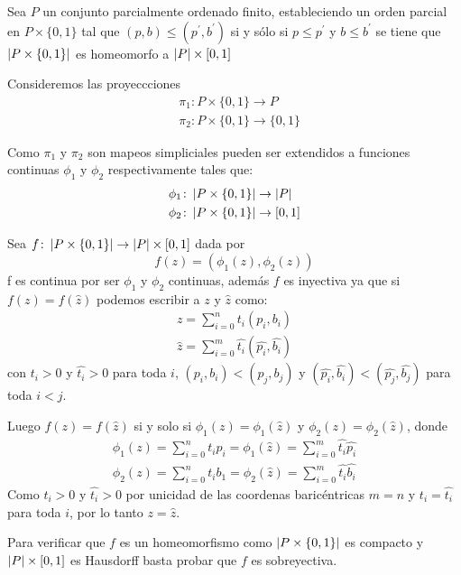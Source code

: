 \begin{Teo}
Sea $P$ un conjunto parcialmente ordenado finito, estableciendo un orden parcial en $P\times\{0,1\}$ tal que $(p,b)\leq (p^{'},b^{'})$ si y sólo si $p\leq p^{'}$ y $b\leq b^{'}$ se tiene que $\left| P\times\{0,1\} \right|$ es homeomorfo a $\left| P \right|\times[0,1]$
\end{Teo} 
\begin{Dem}

Consideremos las proyeccciones
\begin{align*}
&\pi_1\colon P\times\{0,1\} \rightarrow P\\
&\pi_2\colon P\times\{0,1\} \rightarrow \{0,1\}
\end{align*}

Como $\pi_1$ y $\pi_2$ son mapeos simpliciales pueden ser extendidos a funciones continuas $\phi_1$ y $\phi_2$ respectivamente tales que:
\begin{align*}
&\phi_1\colon\left| P\times\{0,1\} \right| \rightarrow \left| P \right|\\
&\phi_2\colon\left| P\times\{0,1\} \right| \rightarrow [0,1]
\end{align*}

Sea $f\colon\left| P\times \{0,1\} \right| \rightarrow \left| P \right|\times [0,1]$ dada por 
\begin{equation*}
f(z)= (\phi_1(z),\phi_2(z))
\end{equation*}
f es continua por ser $\phi_1$ y $\phi_2$ continuas, además $f$ es inyectiva ya que si $f(z)=f(\hat{z})$ podemos escribir a $z$ y $\hat{z}$ como:
\begin{eqnarray}
z = \sum_{i=0}^{n}t_i(p_i,b_i)\\
\hat{z} = \sum_{i=0}^{m}\hat{t_i}(\hat{p_i},\hat{b_i})
\end{eqnarray} 
con $t_i>0$ y $\hat{t_i}>0$ para toda $i$, $(p_i,b_i)<(p_j,b_j)$ y $(\hat{p_i},\hat{b_i})<(\hat{p_j},\hat{b_j})$ para toda $i<j$.

Luego $f(z) = f(\hat{z})$ si y solo si $\phi_1(z)=\phi_1(\hat{z})$ y $\phi_2(z)=\phi_2(\hat{z})$, donde 
\begin{eqnarray}
\phi_1(z) = \sum_{i=0}^{n}t_ip_i = \phi_1(\hat{z}) = \sum_{i=0}^{m}\hat{t_i}\hat{p_i}\\
\phi_2(z) = \sum_{i=0}^{n}t_ib_1 = \phi_2(\hat{z}) = \sum_{i=0}^{m}\hat{t_i}\hat{b_i}
\end{eqnarray}
Como $t_i>0$ y $\hat{t_i}>0$ por unicidad de las coordenas baricéntricas $m=n$ y $t_i = \hat{t_i}$ para toda $i$, por lo tanto $z = \hat{z}$.

Para verificar que $f$ es un homeomorfismo como $\left| P\times\{0,1\} \right|$ es compacto y $\left| P \right|\times[0,1]$ es Hausdorff basta probar que $f$ es sobreyectiva. 


\end{Dem}
